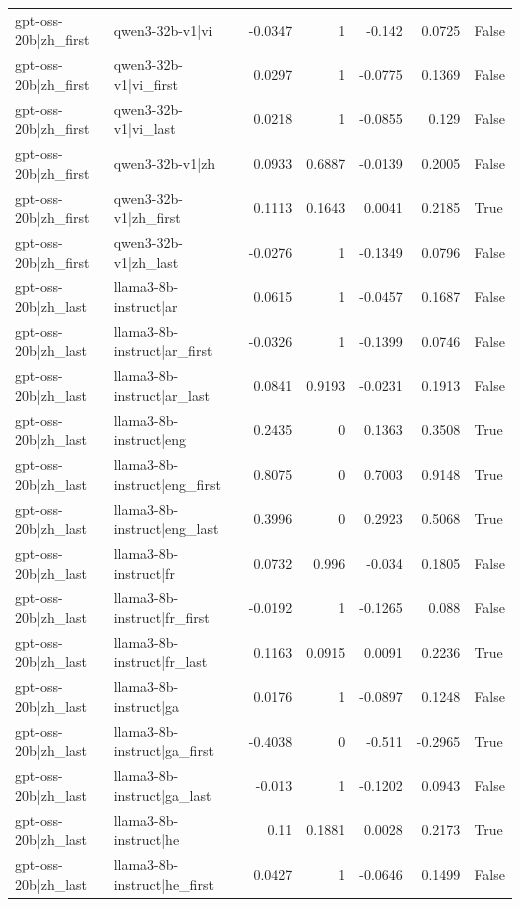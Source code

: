 \begin{table}
\begin{tabular}{l l r r r r l}
gpt-oss-20b|zh_first & qwen3-32b-v1|vi & -0.0347 & 1 & -0.142 & 0.0725 & False \\
gpt-oss-20b|zh_first & qwen3-32b-v1|vi_first & 0.0297 & 1 & -0.0775 & 0.1369 & False \\
gpt-oss-20b|zh_first & qwen3-32b-v1|vi_last & 0.0218 & 1 & -0.0855 & 0.129 & False \\
gpt-oss-20b|zh_first & qwen3-32b-v1|zh & 0.0933 & 0.6887 & -0.0139 & 0.2005 & False \\
gpt-oss-20b|zh_first & qwen3-32b-v1|zh_first & 0.1113 & 0.1643 & 0.0041 & 0.2185 & True \\
gpt-oss-20b|zh_first & qwen3-32b-v1|zh_last & -0.0276 & 1 & -0.1349 & 0.0796 & False \\
gpt-oss-20b|zh_last & llama3-8b-instruct|ar & 0.0615 & 1 & -0.0457 & 0.1687 & False \\
gpt-oss-20b|zh_last & llama3-8b-instruct|ar_first & -0.0326 & 1 & -0.1399 & 0.0746 & False \\
gpt-oss-20b|zh_last & llama3-8b-instruct|ar_last & 0.0841 & 0.9193 & -0.0231 & 0.1913 & False \\
gpt-oss-20b|zh_last & llama3-8b-instruct|eng & 0.2435 & 0 & 0.1363 & 0.3508 & True \\
gpt-oss-20b|zh_last & llama3-8b-instruct|eng_first & 0.8075 & 0 & 0.7003 & 0.9148 & True \\
gpt-oss-20b|zh_last & llama3-8b-instruct|eng_last & 0.3996 & 0 & 0.2923 & 0.5068 & True \\
gpt-oss-20b|zh_last & llama3-8b-instruct|fr & 0.0732 & 0.996 & -0.034 & 0.1805 & False \\
gpt-oss-20b|zh_last & llama3-8b-instruct|fr_first & -0.0192 & 1 & -0.1265 & 0.088 & False \\
gpt-oss-20b|zh_last & llama3-8b-instruct|fr_last & 0.1163 & 0.0915 & 0.0091 & 0.2236 & True \\
gpt-oss-20b|zh_last & llama3-8b-instruct|ga & 0.0176 & 1 & -0.0897 & 0.1248 & False \\
gpt-oss-20b|zh_last & llama3-8b-instruct|ga_first & -0.4038 & 0 & -0.511 & -0.2965 & True \\
gpt-oss-20b|zh_last & llama3-8b-instruct|ga_last & -0.013 & 1 & -0.1202 & 0.0943 & False \\
gpt-oss-20b|zh_last & llama3-8b-instruct|he & 0.11 & 0.1881 & 0.0028 & 0.2173 & True \\
gpt-oss-20b|zh_last & llama3-8b-instruct|he_first & 0.0427 & 1 & -0.0646 & 0.1499 & False \\

\end{tabular}
\end{table}
